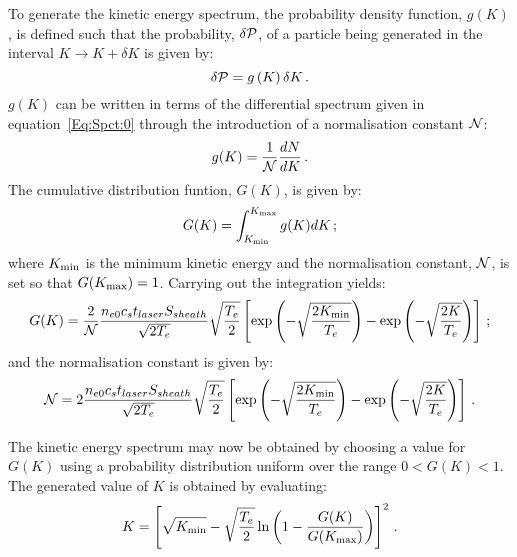 To generate the kinetic energy spectrum, the probability density
function, $g(K)$, is defined such that the probability,
$\delta {\cal P}$, of a particle being generated in the interval
$K \rightarrow K + \delta K$ is given
by:
\begin{equation}
   \delta {\cal P} = g \left( K \right) \delta K \, .
\end{equation}
$g(K)$ can be written in terms of the differential spectrum
given in equation~\ref{Eq:Spct:0} through the introduction of a
normalisation constant ${\cal N}$:
\begin{equation}
  g(K) = \frac{1}{\cal N} \frac{dN}{dK} \, .
\end{equation}
The cumulative distribution funtion, $G(K)$, is given by:
\begin{equation}
  G(K) = \int_{K_{\rm min}}^{K_{\rm max}} g(K)
                                               dK \,;
\end{equation}
where $K_{\rm min}$ is the minimum kinetic energy and the
normalisation constant, ${\cal N}$, is set so that
$G(K_{\rm max}) = 1$.
Carrying out the integration yields:
\begin{equation}
  G(K) = \frac{2}{\cal N}
                   \frac{n_{e0} c_{s} t_{laser} S_{sheath}} {\sqrt{2T_{e}}}
                   \sqrt{\frac{T_{e}}{2}}
                   \left[
                         \exp\left(
                                   -\sqrt{\frac{2K_{\rm min}}{T_{e}}}
                             \right) -
                         \exp\left(
                                   -\sqrt{\frac{2K}{T_{e}}}
                             \right)
                   \right] \, ;
\end{equation}
and the normalisation constant is given by:
\begin{equation}
  {\cal N} = 2
             \frac{n_{e0} c_{s} t_{laser} S_{sheath}} {\sqrt{2T_{e}}}
             \sqrt{\frac{T_{e}}{2}}
             \left[
                   \exp\left(
                             -\sqrt{\frac{2K_{\rm min}}{T_{e}}}
                             \right) -
                         \exp\left(
                                   -\sqrt{\frac{2K}{T_{e}}}
                              \right)
             \right] \, .
\end{equation}

The kinetic energy spectrum may now be obtained by choosing a value
for $G(K)$ using a probability distribution uniform over the
range $0 < G(K) < 1$.
The generated value of $K$ is obtained by evaluating:
\begin{equation}
  K = \left[
                      \sqrt{K_{\rm min}} -
                      \sqrt{\frac{T_e}{2}} \ln \left(
                     1 - \frac{G(K)}{G(K_{\rm max})}
                                               \right)
                \right]^2 \, .
\end{equation}

